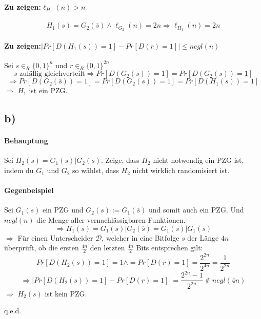 \documentclass[a4paper,11pt,twoside]{scrartcl}
\begin{document}
\paragraph{Zu zeigen:$\ell_{H_1}(n) > n$}
\[ H_1(s) = G_2(\overline{s}) \land \ell_{G_2}(n) = 2n \Rightarrow \ell_{H_1}(n)=2n \]
\paragraph{Zu zeigen:$\left|Pr\left[D(H_1(s))= 1\right] - Pr\left[D(r) = 1\right]\right| \leq negl(n) $}
Sei $s\in_R\{ 0,1 \}^n$ und $r\in_R\{ 0,1 \}^{2n}$
\[ s\text{ zufällig gleichverteilt} \Rightarrow Pr\left[D(G_2(\overline s))=1\right] =Pr\left[D(G_2(s))= 1\right]\]
\[\Rightarrow Pr\left[D(G_2(\overline s))=1\right]=Pr\left[D(G_2(s))=1\right]=Pr\left[D(H_1(s))=1\right]\]
$\Rightarrow$ $H_1$ ist ein PZG.

\subsection*{b)}
\paragraph{Behauptung}
Sei $H_2(s) = G_1(s)|G_2(\overline s)$. Zeige, dass $H_2$ nicht notwendig ein PZG ist, indem du $G_1$ und $G_2$ so wählst, dass $H_2$ nicht wirklich randomisiert ist.
\paragraph{Gegenbeispiel}
Sei $G_1(s)$ ein PZG und $G_2(s) := G_1(\overline s)$ und somit auch ein PZG. Und $negl(n)$ die Menge aller vernachlässigbaren Funktionen.
\[ \Rightarrow H_1(s)=G_1(s)|G_2(\overline s) = G_1(s)|G_1(s) \]
$\Rightarrow$ Für einen Unterscheider $\mathcal D$, welcher in eine Bitfolge $s$ der Länge $4n$ überprüft, ob die ersten $\frac{4n}{2}$ den letzten $\frac{4n}{2}$ Bits entsprechen gilt:
\[ Pr\left[D(H_2(s))= 1\right] = 1 \land =Pr\left[D(r)= 1\right] = \frac{2^{2n}}{2^{4n}} = \frac{1}{2^{2n}} \]
\[\Rightarrow \left|Pr\left[D(H_2(s))= 1\right] - Pr\left[D(r) = 1\right]\right| = \frac{2^{2n}-1}{2^{2n}}\notin negl(4n)  \]
$\Rightarrow$ $H_2(s)$ ist kein PZG.
\begin{flushright}
	q.e.d.
\end{flushright}  
\end{document}
